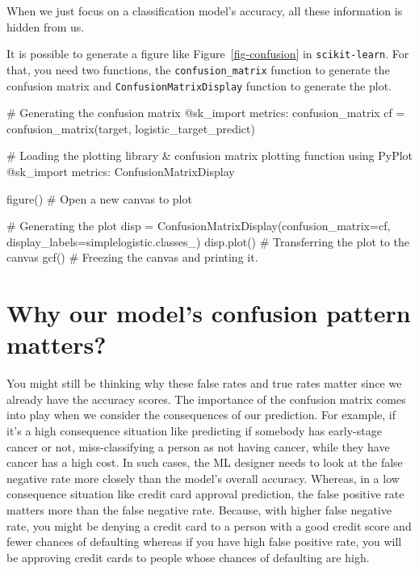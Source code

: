 \documentclass[
  letterpaper,
]{book}
\newenvironment{Shaded}{\begin{snugshade}}{\end{snugshade}}
\newcommand{\BuiltInTok}[1]{\textcolor[rgb]{0.00,0.23,0.31}{#1}}
\newcommand{\CommentTok}[1]{\textcolor[rgb]{0.37,0.37,0.37}{#1}}
\newcommand{\FunctionTok}[1]{\textcolor[rgb]{0.28,0.35,0.67}{#1}}
\newcommand{\ImportTok}[1]{\textcolor[rgb]{0.00,0.46,0.62}{#1}}
\newcommand{\NormalTok}[1]{\textcolor[rgb]{0.00,0.23,0.31}{#1}}
\newcommand{\OperatorTok}[1]{\textcolor[rgb]{0.37,0.37,0.37}{#1}}
\newcommand{\PreprocessorTok}[1]{\textcolor[rgb]{0.68,0.00,0.00}{#1}}
\begin{document}
When we just focus on a classification model's accuracy, all these
information is hidden from us.

It is possible to generate a figure like Figure~\ref{fig-confusion} in
\texttt{scikit-learn}. For that, you need two functions, the
\texttt{confusion\_matrix} function to generate the confusion matrix and
\texttt{ConfusionMatrixDisplay} function to generate the plot.

\begin{Shaded}
\begin{Highlighting}[]
\CommentTok{\# Generating the confusion matrix }
\PreprocessorTok{@sk\_import}\NormalTok{ metrics}\OperatorTok{:}\NormalTok{ confusion\_matrix}
\NormalTok{cf }\OperatorTok{=} \FunctionTok{confusion\_matrix}\NormalTok{(target, logistic\_target\_predict)}

\CommentTok{\# Loading the plotting library \& confusion matrix plotting function}
\ImportTok{using} \BuiltInTok{PyPlot}
\PreprocessorTok{@sk\_import}\NormalTok{ metrics}\OperatorTok{:}\NormalTok{ ConfusionMatrixDisplay}

\FunctionTok{figure}\NormalTok{() }\CommentTok{\# Open a new canvas to plot}

\CommentTok{\# Generating the plot }
\NormalTok{disp }\OperatorTok{=} \FunctionTok{ConfusionMatrixDisplay}\NormalTok{(confusion\_matrix}\OperatorTok{=}\NormalTok{cf,}
\NormalTok{            display\_labels}\OperatorTok{=}\NormalTok{simplelogistic.classes\_)}
\NormalTok{disp.}\FunctionTok{plot}\NormalTok{() }\CommentTok{\# Transferring the plot to the canvas}
\FunctionTok{gcf}\NormalTok{() }\CommentTok{\# Freezing the canvas and printing it.}
\end{Highlighting}
\end{Shaded}

\hypertarget{why-our-models-confusion-pattern-matters}{%
\section{Why our model's confusion pattern
matters?}\label{why-our-models-confusion-pattern-matters}}

You might still be thinking why these false rates and true rates matter
since we already have the accuracy scores. The importance of the
confusion matrix comes into play when we consider the consequences of
our prediction. For example, if it's a high consequence situation like
predicting if somebody has early-stage cancer or not, miss-classifying a
person as not having cancer, while they have cancer has a high cost. In
such cases, the ML designer needs to look at the false negative rate
more closely than the model's overall accuracy. Whereas, in a low
consequence situation like credit card approval prediction, the false
positive rate matters more than the false negative rate. Because, with
higher false negative rate, you might be denying a credit card to a
person with a good credit score and fewer chances of defaulting whereas
if you have high false positive rate, you will be approving credit cards
to people whose chances of defaulting are high.
\end{document}
